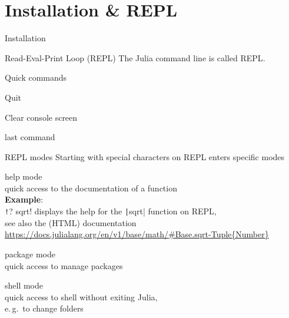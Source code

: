 \documentclass[aspectratio=169, handout]{beamer}
\begin{document}
    \section{Installation \& REPL}
    \begin{frame}{Installation}
    \end{frame}
    \begin{frame}{Read-Eval-Print Loop (REPL)}
        The Julia command line is called \alert{REPL}.

        Quick commands
        \begin{description}[leftmargin=1em]
            \item[\^\ D] Quit
            \item[\^\ L] Clear console screen
            \item[Up Arrow] last command
        \end{description}
    \end{frame}
    \begin{frame}{REPL modes}
        Starting with special characters on REPL enters specific modes
        \begin{description}[leftmargin=1em]
            \item[?] help mode\\
            quick access to the documentation of a function
            \\[.5\baselineskip]
            \textbf{Example}:\\
            \texttt!? sqrt! displays the help for the \texttt|sqrt| function on REPL,
            \\
            see also the (HTML) documentation\\
            {\footnotesize\url{https://docs.julialang.org/en/v1/base/math/\#Base.sqrt-Tuple{Number}}}
            \\[-.66\baselineskip]
            \item[{]}] package mode
            \\ quick access to manage packages
            \item[;] shell mode
            \\ quick access to shell without exiting Julia,\\
            e.\,g.\ to change folders
        \end{description}
    \end{frame}
\end{document}
